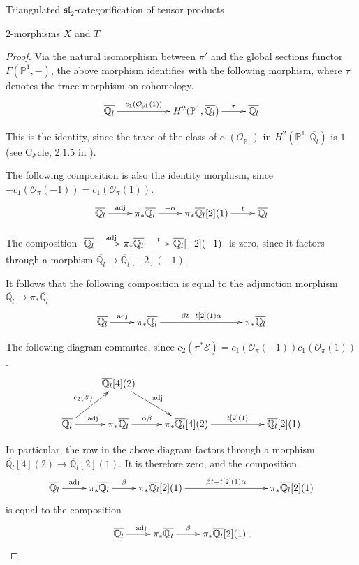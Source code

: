 \documentclass[12pt]{amsart}
\theoremstyle{definition}
\theoremstyle{remark}
\theoremstyle{remark}
\begin{document}
\begin{section}{Triangulated $\mathfrak{sl}_{2}$-categorification of tensor products}
\begin{subsection}{2-morphisms $X$ and $T$}
\begin{proof}
Via the natural isomorphism between $\pi'$ and the global sections functor $\Gamma(\mathbb{P}^{1},-)$, the above morphism identifies with the following morphism, where $\tau$ denotes the trace morphism on cohomology. \[ \xymatrix{\overline{\mathbb{Q}_{l}} \ar[rr]^-{c_{1}(\mathcal{O}_{\mathbb{P}^{1}}(1))} && H^{2}(\mathbb{P}^{1},\overline{\mathbb{Q}_{l}}) \ar[r]^-{\tau} & \overline{\mathbb{Q}_{l}}} \] 

This is the identity, since the trace of the class of $c_{1}(\mathcal{O}_{\mathbb{P}^{1}})$ in $H^{2}(\mathbb{P}^{1},\overline{\mathbb{Q}_{l}})$ is $1$ (see Cycle, 2.1.5 in \cite{DeligneCohomologieEtale}).

The following composition is also the identity morphism, since $-c_{1}(\mathcal{O}_{\pi}(-1)) = c_{1}(\mathcal{O}_{\pi}(1))$. \[ \xymatrix{ \overline{\mathbb{Q}_{l}} \ar[r]^-{\text{adj}} & \pi_{*} \overline{\mathbb{Q}_{l}} \ar[r]^-{-\alpha} & \pi_{*} \overline{\mathbb{Q}_{l}}[2](1) \ar[r]^-{t} & \overline{\mathbb{Q}_{l}} } \] 
 
The composition $\xymatrix{ \overline{\mathbb{Q}_{l}} \ar[r]^{\text{adj}} & \pi_{*}\overline{\mathbb{Q}_{l}} \ar[r]^-{t} & \overline{\mathbb{Q}_{l}}[-2](-1) }$ is zero, since it factors through a morphism $\overline{\mathbb{Q}_{l}} \rightarrow \overline{\mathbb{Q}_{l}}[-2](-1)$. 

It follows that the following composition is equal to the adjunction morphism $\overline{\mathbb{Q}_{l}} \rightarrow \pi_{*}\overline{\mathbb{Q}_{l}}$. \[ \xymatrix{ \overline{\mathbb{Q}_{l}} \ar[r]^-{\text{adj}} & \pi_{*} \overline{\mathbb{Q}_{l}} \ar[rrr]^{\beta t - t[2](1)\alpha} &&& \pi_{*} \overline{\mathbb{Q}_{l}} } \] 

The following diagram commutes, since $c_{2}(\pi^{*}\mathscr{E}) = c_{1}(\mathcal{O}_{\pi}(-1)) c_{1}(\mathcal{O}_{\pi}(1))$. \[ \xymatrix{ & \overline{\mathbb{Q}_{l}}[4](2) \ar[dr]^{\text{adj}} & & \\ \overline{\mathbb{Q}_{l}} \ar[ur]^{c_{2}(\mathscr{E})} \ar[r]^{\text{adj}} & \pi_{*}\overline{\mathbb{Q}_{l}} \ar[r]^-{\alpha \beta} & \pi_{*}\overline{\mathbb{Q}_{l}}[4](2) \ar[rr]^-{t[2](1)} && \overline{\mathbb{Q}_{l}}[2](1) } \] 

In particular, the row in the above diagram factors through a morphism $\overline{\mathbb{Q}_{l}}[4](2) \rightarrow \overline{\mathbb{Q}_{l}}[2](1)$. It is therefore zero, and the composition \[ \xymatrix{ \overline{\mathbb{Q}_{l}} \ar[r]^-{\text{adj}} & \pi_{*}\overline{\mathbb{Q}_{l}} \ar[r]^-{\beta} & \pi_{*} \overline{\mathbb{Q}_{l}}[2](1) \ar[rrr]^-{\beta t -t[2](1)\alpha} &&& \pi_{*}\overline{\mathbb{Q}_{l}}[2](1)  } \] is equal to the composition \[ \xymatrix{ \overline{\mathbb{Q}_{l}} \ar[r]^{\text{adj}} & \pi_{*} \overline{\mathbb{Q}_{l}} \ar[r]^-{\beta} & \pi_{*} \overline{\mathbb{Q}_{l}}[2](1) }. \] 


\end{proof}
\end{subsection}
\end{section}
\end{document}
